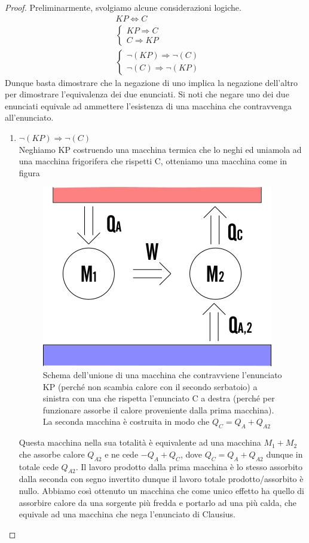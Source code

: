 \documentclass[
10pt, %
a4paper, %
oneside, %
headinclude,footinclude, %
BCOR5mm, %
]{scrartcl}
\begin{document}
\begin{proof}
Preliminarmente, svolgiamo alcune considerazioni logiche.
\begin{align*}
	&KP \Leftrightarrow C\\
	&\begin{cases}
		KP \Rightarrow C\\
		C \Rightarrow KP
	\end{cases}\\
	&\begin{cases}
		\neg(KP)\Rightarrow \neg(C)\\
		\neg(C)\Rightarrow \neg(KP)
	\end{cases}
\end{align*}
Dunque basta dimostrare che la negazione di uno implica la negazione dell'altro per dimostrare l'equivalenza dei due enunciati. Si noti che negare uno dei due enunciati equivale ad ammettere l'esistenza di una macchina che contravvenga all'enunciato. 
\begin{enumerate}
	\item \(\neg(KP)\Rightarrow \neg(C)\)\\
	
	Neghiamo KP costruendo una macchina termica che lo neghi ed uniamola ad una macchina frigorifera che rispetti C, otteniamo una macchina come in figura
	\begin{figure}[h!]
		\centering
		\includegraphics[width=0.5\linewidth]{../images/KP-C}
		\caption{Schema dell'unione di una macchina che contravviene l'enunciato KP (perché non scambia calore con il secondo serbatoio) a sinistra con una che rispetta l'enunciato C a destra (perché per funzionare assorbe il calore proveniente dalla prima macchina). La seconda macchina è costruita in modo che \(Q_C = Q_A + Q_{A2}\)}
		\label{fig:kp-c}
	\end{figure}
	\FloatBarrier
	Questa macchina nella sua totalità è equivalente ad una macchina \(M_1 + M_2\) che assorbe calore \(Q_{A2}\) e ne cede \(-Q_A+Q_C\), dove $Q_C = Q_{A}+Q_{A2}$ dunque in totale cede \(Q_{A2}\). Il lavoro prodotto dalla prima macchina è lo stesso assorbito dalla seconda con segno invertito dunque il lavoro totale prodotto/assorbito è nullo. Abbiamo così ottenuto un macchina che come unico effetto ha quello di assorbire calore da una sorgente più fredda e portarlo ad una più calda, che equivale ad una macchina che nega l'enunciato di Clausius.
	

\end{enumerate}
\end{proof}
\end{document}
